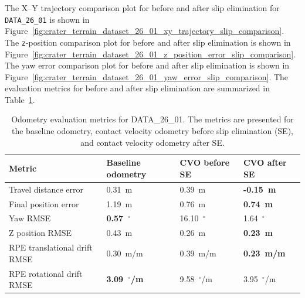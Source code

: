 \documentclass[report.tex]{subfiles}
\begin{document}
    The X--Y trajectory comparison plot for before and after slip elimination for \texttt{DATA\_26\_01} is shown in Figure~\ref{fig:crater_terrain_dataset_26_01_xy_trajectory_slip_comparison}. The \texttt{z}-position comparison plot for before and after slip elimination is shown in Figure~\ref{fig:crater_terrain_dataset_26_01_z_position_error_slip_comparison}. The yaw error comparison plot for before and after slip elimination is shown in Figure~\ref{fig:crater_terrain_dataset_26_01_yaw_error_slip_comparison}. The evaluation metrics for before and after slip elimination are summarized in Table~\ref{tab:odometry_metrics_data-26-01_beforeAfter_slip_elimination}.
    
    \begin{table}[!htbp]
    \centering
    \caption[Odometry evaluation metrics for DATA\_26\_01.]{ Odometry evaluation metrics for DATA\_26\_01. The metrics are presented for the baseline odometry, contact velocity odometry before slip elimination (SE), and contact velocity odometry after SE.}
    \label{tab:odometry_metrics_data-26-01_beforeAfter_slip_elimination}
    \begin{tabular}{llll}
        \hline
        Metric & Baseline odometry & CVO before SE & CVO after SE \\ 
        \hline
        Travel distance error
        & 0.31~m
        & 0.39~m
        & \textbf{-0.15~m} \\

        Final position error
        & 1.19~m
        & 0.76~m
        & \textbf{0.74~m} \\

        Yaw RMSE
        & \textbf{0.57~$^\circ$}
        & 16.10~$^\circ$
        & 1.64~$^\circ$ \\

        Z position RMSE
        & 0.43~m
        & 0.26~m
        & \textbf{0.23~m} \\

        RPE translational drift RMSE
        & 0.30~m/m
        & 0.39~m/m
        & \textbf{0.23~m/m} \\

        RPE rotational drift RMSE
        & \textbf{3.09~$^\circ$/m}
        & 9.58~$^\circ$/m
        & 3.95~$^\circ$/m \\
        \hline
    \end{tabular}
    \end{table}
    
\end{document}
